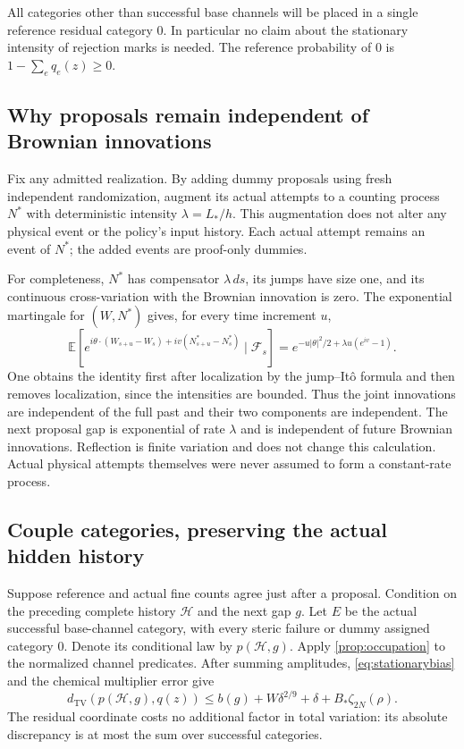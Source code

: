 \documentclass[11pt]{article}
\numberwithin{equation}{section}
\theoremstyle{definition}
\theoremstyle{remark}\newtheorem{remark}[theorem]{Remark}
\newcommand{\E}{\mathbb E}
\newcommand{\TV}{d_{\mathrm{TV}}}
\newcommand{\ds}{\,ds}
\begin{document}
All categories other than successful base channels will be placed in a
single reference residual category $0$. In particular no claim about the
stationary intensity of rejection marks is needed. The reference probability
of $0$ is $1-\sum_eq_e(z)\ge0$.

\subsection{Why proposals remain independent of Brownian innovations}

Fix any admitted realization. By adding dummy proposals using fresh
independent randomization, augment its actual attempts to a counting process
$N^*$ with deterministic intensity $\lambda=L_*/h$. This augmentation
does not alter any physical event or the policy's input history. Each actual
attempt remains an event of $N^*$; the added events are proof-only dummies.

For completeness, $N^*$ has compensator $\lambda\ds$, its jumps have size
one, and its continuous cross-variation with the Brownian innovation is zero.
The exponential martingale for $(W,N^*)$ gives, for every time increment $u$,
\begin{equation}\label{eq:jointchar}
 \E[e^{i\theta\cdot(W_{s+u}-W_s)+iv(N^*_{s+u}-N^*_s)}
       \mid\mathcal F_s]
 =e^{-u|\theta|^2/2+\lambda u(e^{iv}-1)}.
\end{equation}
One obtains the identity first after localization by the jump--It\^o
formula and then removes localization, since the intensities are bounded.
Thus the joint innovations are independent of the full past and their two
components are independent. The next proposal gap is exponential of rate
$\lambda$ and is independent of future Brownian innovations. Reflection is
finite variation and does not change this calculation. Actual physical
attempts themselves were never assumed to form a constant-rate process.

\subsection{Couple categories, preserving the actual hidden history}

Suppose reference and actual fine counts agree just after a proposal.
Condition on the preceding complete history $\mathcal H$ and the next gap
$g$. Let $E$ be the actual successful base-channel category, with every
steric failure or dummy assigned category $0$. Denote its conditional law
by $p(\mathcal H,g)$. Apply \cref{prop:occupation} to the normalized
channel predicates. After summing amplitudes, \eqref{eq:stationarybias}
and the chemical multiplier error give
\begin{equation}\label{eq:categoryerror}
 \TV(p(\mathcal H,g),q(z))
 \le b(g)+W\delta^{2/9}+\delta+B_*\zeta_{2N}(\rho).
\end{equation}
The residual coordinate costs no additional factor in total variation:
its absolute discrepancy is at most the sum over successful categories.
\end{document}
